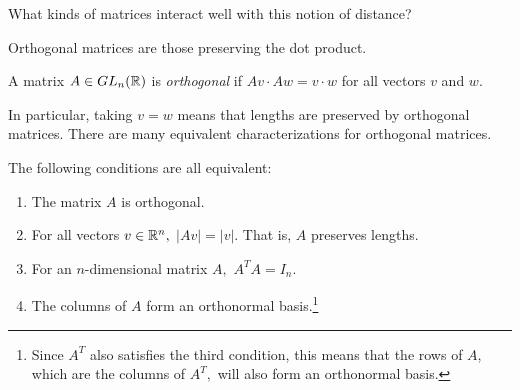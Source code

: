 \begin{qq}
What kinds of matrices interact well with this notion of distance?
\end{qq}

Orthogonal matrices are those preserving the dot product.
\begin{definition}
    A matrix $A \in GL_n(\mathbb R)$ is \emph{orthogonal} if $Av \cdot A w = v \cdot w$ for all vectors $v$ and $w.$
\end{definition}

In particular, taking $v = w$ means that lengths are preserved by orthogonal matrices. There are many equivalent characterizations for orthogonal matrices.
\begin{theorem}
    The following conditions are all equivalent:
    \begin{enumerate}
        \item The matrix $A$ is orthogonal.
        \item For all vectors $v \in \mathbb R^n,$ $|Av| = |v|$. That is, $A$ preserves lengths.
        \item For an $n$-dimensional matrix $A,$ $A^T A = I_n$.
        \item The columns of $A$ form an orthonormal basis.\footnote{Since $A^T$ also satisfies the third condition, this means that the rows of $A$, which are the columns of $A^T,$ will also form an orthonormal basis.}
    \end{enumerate}
\end{theorem}
